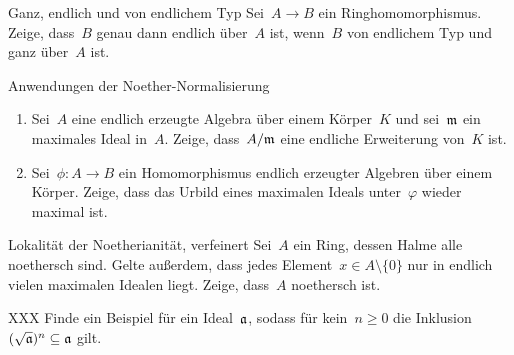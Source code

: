\documentclass[entwurf]{uebblatt}
\begin{document}

\begin{aufgabe}{}{Ganz, endlich und von endlichem Typ}
Sei~$A \to B$ ein Ringhomomorphismus. Zeige, dass~$B$ genau dann endlich
über~$A$ ist, wenn~$B$ von endlichem Typ und ganz über~$A$ ist.
\end{aufgabe}

\begin{aufgabe}{}{Anwendungen der Noether-Normalisierung}
\begin{enumerate}
\item Sei~$A$ eine endlich erzeugte Algebra über einem Körper~$K$ und
sei~$\mathfrak{m}$ ein maximales Ideal in~$A$. Zeige, dass~$A/\mathfrak{m}$ eine endliche
Erweiterung von~$K$ ist.
\item Sei~$\phi : A \to B$ ein Homomorphismus endlich erzeugter Algebren über
einem Körper. Zeige, dass das Urbild eines maximalen Ideals unter~$\varphi$ wieder
maximal ist.
\end{enumerate}
\end{aufgabe}

\begin{aufgabe}{}{Lokalität der Noetherianität, verfeinert}
Sei~$A$ ein Ring, dessen Halme alle noethersch sind. Gelte außerdem, dass
jedes Element~$x \in A \setminus \{0\}$ nur in endlich vielen maximalen Idealen
liegt. Zeige, dass~$A$ noethersch ist.
\end{aufgabe}

\begin{aufgabe}{}{XXX}
Finde ein Beispiel für ein Ideal~$\mathfrak{a}$, sodass für kein~$n \geq 0$
die Inklusion~$(\sqrt{\mathfrak{a}})^n \subseteq \mathfrak{a}$ gilt.
\end{aufgabe}
\end{document}

